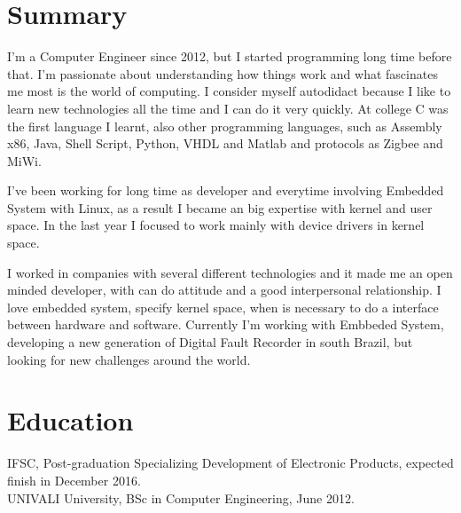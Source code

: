 \documentclass[margin]{res}
\begin{document}
\address{São José, BR \\ diogojusten@gmail.com \\ Phone: +55 (48) 9994-4758 }

\begin{resume}

\section{Summary}
I'm a Computer Engineer since 2012, but I started programming long time before that. I’m passionate about understanding how things work and what fascinates me most is
the world of computing. I consider myself autodidact because I like to learn new technologies all the time and I can do it very quickly. At college C was the first language I learnt, also other programming languages, such as Assembly x86, Java, Shell Script, Python, VHDL and Matlab and protocols as Zigbee and MiWi.

I've been working for long time as developer and everytime involving Embedded System with Linux, as a result I became an big expertise with kernel and user space. In the last year I focused to work mainly with device drivers in kernel space. 

I worked in companies with several different technologies and it made me an open minded developer, with can do attitude and a good interpersonal relationship. I love embedded system, specify kernel space, when is necessary to do a interface between hardware and software. Currently I’m working with Embbeded System, developing a new generation of Digital Fault Recorder in south Brazil, but looking for new challenges around the world.

\section{Education}
 IFSC, Post-graduation Specializing Development of Electronic Products, expected finish in December 2016.\\
 UNIVALI University, BSc in Computer Engineering, June 2012.


\end{resume}
\end{document}
